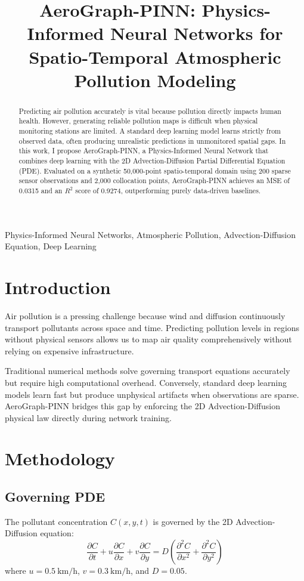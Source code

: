 \documentclass[conference]{IEEEtran}
\title{AeroGraph-PINN: Physics-Informed Neural Networks for Spatio-Temporal Atmospheric Pollution Modeling}
\author{
\IEEEauthorblockN{Astha Ajitkumar Patel}
\IEEEauthorblockA{\textit{Project Repository:} \url{https://github.com/asthaap5347/AeroGraph-PINN}}
}
\begin{document}
\maketitle

\begin{abstract}
Predicting air pollution accurately is vital because pollution directly impacts human health. However, generating reliable pollution maps is difficult when physical monitoring stations are limited. A standard deep learning model learns strictly from observed data, often producing unrealistic predictions in unmonitored spatial gaps. In this work, I propose AeroGraph-PINN, a Physics-Informed Neural Network that combines deep learning with the 2D Advection-Diffusion Partial Differential Equation (PDE). Evaluated on a synthetic 50,000-point spatio-temporal domain using 200 sparse sensor observations and 2,000 collocation points, AeroGraph-PINN achieves an MSE of 0.0315 and an $R^2$ score of 0.9274, outperforming purely data-driven baselines.
\end{abstract}

\begin{IEEEkeywords}
Physics-Informed Neural Networks, Atmospheric Pollution, Advection-Diffusion Equation, Deep Learning
\end{IEEEkeywords}

\section{Introduction}
Air pollution is a pressing challenge because wind and diffusion continuously transport pollutants across space and time. Predicting pollution levels in regions without physical sensors allows us to map air quality comprehensively without relying on expensive infrastructure.

Traditional numerical methods solve governing transport equations accurately but require high computational overhead. Conversely, standard deep learning models learn fast but produce unphysical artifacts when observations are sparse. AeroGraph-PINN bridges this gap by enforcing the 2D Advection-Diffusion physical law directly during network training.

\section{Methodology}

\subsection{Governing PDE}
The pollutant concentration $C(x,y,t)$ is governed by the 2D Advection-Diffusion equation:
\begin{equation}
\frac{\partial C}{\partial t} + u\frac{\partial C}{\partial x} + v\frac{\partial C}{\partial y} = D\left(\frac{\partial^2 C}{\partial x^2} + \frac{\partial^2 C}{\partial y^2}\right)
\end{equation}
where $u = 0.5~\mathrm{km/h}$, $v = 0.3~\mathrm{km/h}$, and $D = 0.05$.
\end{document}
